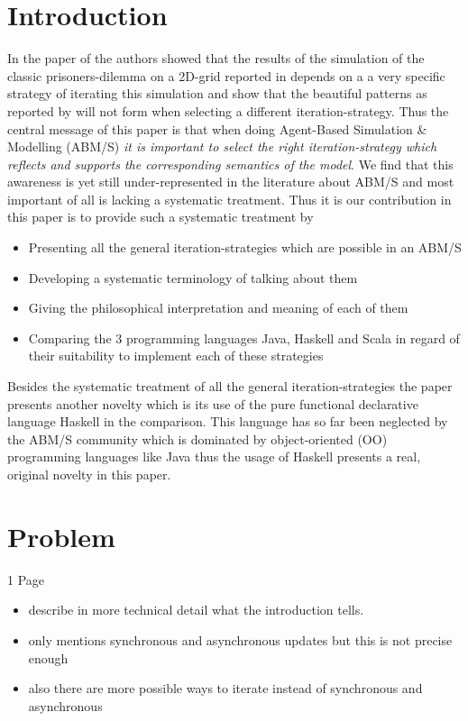 \section{Introduction}
In the paper of \cite{huberman_evolutionary_1993} the authors showed that the results of the simulation of the classic prisoners-dilemma on a 2D-grid reported in \cite{nowak_evolutionary_1992} depends on a a very specific strategy of iterating this simulation and show that the beautiful patterns as reported by \cite{nowak_evolutionary_1992} will not form when selecting a different iteration-strategy. Thus the central message of this paper is that when doing Agent-Based Simulation \& Modelling (ABM/S) \textit{it is important to select the right iteration-strategy which reflects and supports the corresponding semantics of the model}. We find that this awareness is yet still under-represented in the literature about ABM/S and most important of all is lacking a systematic treatment. Thus it is our contribution in this paper is to provide such a systematic treatment by
\begin{itemize}
	\item Presenting all the general iteration-strategies which are possible in an ABM/S
	\item Developing a systematic terminology of talking about them
	\item Giving the philosophical interpretation and meaning of each of them
	\item Comparing the 3 programming languages Java, Haskell and Scala in regard of their suitability to implement each of these strategies
\end{itemize}

Besides the systematic treatment of all the general iteration-strategies the paper presents another novelty which is its use of the pure functional declarative language Haskell in the comparison. This language has so far been neglected by the ABM/S community which is dominated by object-oriented (OO) programming languages like Java thus the usage of Haskell presents a real, original novelty in this paper.


\section{Problem}
1 Page

\begin{itemize}
	\item describe in more technical detail what the introduction tells.
	\item \cite{huberman_evolutionary_1993} only mentions synchronous and asynchronous updates but this is not precise enough
	\item also there are more possible ways to iterate instead of synchronous and asynchronous
\end{itemize}

